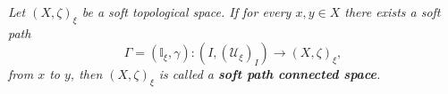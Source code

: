 \documentclass[preprint,12pt]{elsarticle}
\begin{document}











\begin{defn}\em{
Let $(X,\zeta)_\xi$ be a soft topological space. If for every $x,y \in X$  there exists a soft path \[
 \Gamma =(\mathbb{I}_\xi ,\gamma) \colon (I,(\mathscr{U}_{\xi})_{I})\to  (X,\zeta)_\xi,
\] from $x$ to $y$, then $(X,\zeta)_\xi$ is called a \textbf{soft path connected space}.}
\end{defn}
\end{document}
